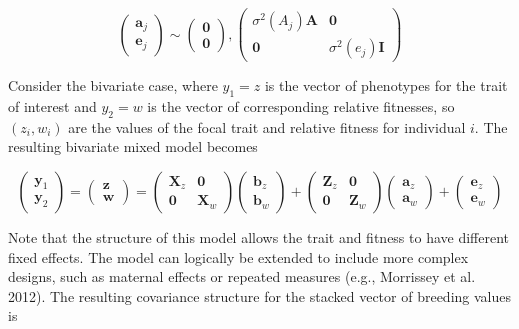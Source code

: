 \documentclass{article}
\begin{document}
\begin{equation}
\begin{pmatrix}\mathbf{a}_{j}\\\mathbf{e}_{j}\end{pmatrix}\sim\begin{pmatrix}\mathbf{0}\\\mathbf{0}\end{pmatrix},\begin{pmatrix}\sigma^{2}(A_{j})\mathbf{A}&\mathbf{0}\\\mathbf{0}&\sigma^{2}(e_{j})\mathbf{I}\end{pmatrix}
\tag{20.26b}
\label{eq:20_26b}
\end{equation}

Consider the bivariate case, where  $ y_1 = z $ is the vector of phenotypes for the trait of interest and  $ y_2 = w $ is the vector of corresponding relative fitnesses, so  $ (z_i, w_i) $ are the values of the focal trait and relative fitness for individual  $ i $. The resulting bivariate mixed model becomes

\begin{equation}
\begin{pmatrix}\mathbf{y}_{1}\\\mathbf{y}_{2}\end{pmatrix}=\begin{pmatrix}\mathbf{z}\\\mathbf{w}\end{pmatrix}=\begin{pmatrix}\mathbf{X}_{z}&\mathbf{0}\\\mathbf{0}&\mathbf{X}_{w}\end{pmatrix}\begin{pmatrix}\mathbf{b}_{z}\\\mathbf{b}_{w}\end{pmatrix}+\begin{pmatrix}\mathbf{Z}_{z}&\mathbf{0}\\\mathbf{0}&\mathbf{Z}_{w}\end{pmatrix}\begin{pmatrix}\mathbf{a}_{z}\\\mathbf{a}_{w}\end{pmatrix}+\begin{pmatrix}\mathbf{e}_{z}\\\mathbf{e}_{w}\end{pmatrix}
\tag{20.27a}
\label{eq:20_27a}
\end{equation}

Note that the structure of this model allows the trait and fitness to have different fixed effects. The model can logically be extended to include more complex designs, such as maternal effects or repeated measures (e.g., Morrissey et al. 2012). The resulting covariance structure for the stacked vector of breeding values is
\end{document}
